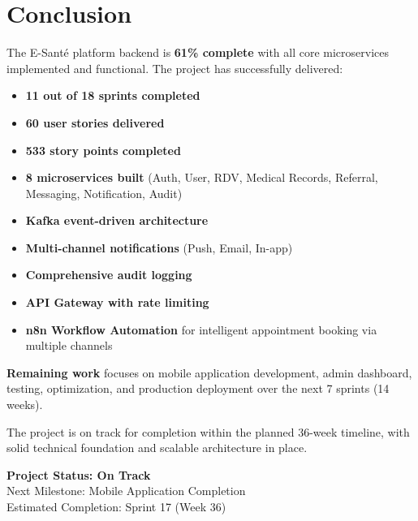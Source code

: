 \documentclass[11pt,a4paper]{article}
\begin{document}
\newpage

\section{Conclusion}

The E-Santé platform backend is \textbf{61\% complete} with all core microservices implemented and functional. The project has successfully delivered:

\begin{successbox}
\begin{itemize}[label=\textcolor{successgreen}{\faCheck}]
    \item \textbf{11 out of 18 sprints completed}
    \item \textbf{60 user stories delivered}
    \item \textbf{533 story points completed}
    \item \textbf{8 microservices built} (Auth, User, RDV, Medical Records, Referral, Messaging, Notification, Audit)
    \item \textbf{Kafka event-driven architecture}
    \item \textbf{Multi-channel notifications} (Push, Email, In-app)
    \item \textbf{Comprehensive audit logging}
    \item \textbf{API Gateway with rate limiting}
    \item \textbf{n8n Workflow Automation} for intelligent appointment booking via multiple channels
\end{itemize}
\end{successbox}

\vspace{1cm}

\textbf{Remaining work} focuses on mobile application development, admin dashboard, testing, optimization, and production deployment over the next 7 sprints (14 weeks).

The project is on track for completion within the planned 36-week timeline, with solid technical foundation and scalable architecture in place.

\vspace{2cm}

\begin{center}
\begin{tcolorbox}[width=12cm,colback=primaryblue!5,colframe=primaryblue]
\centering
\Large\textbf{Project Status: On Track}\\[0.5cm]
\normalsize
Next Milestone: Mobile Application Completion\\
Estimated Completion: Sprint 17 (Week 36)
\end{tcolorbox}
\end{center}
\end{document}
